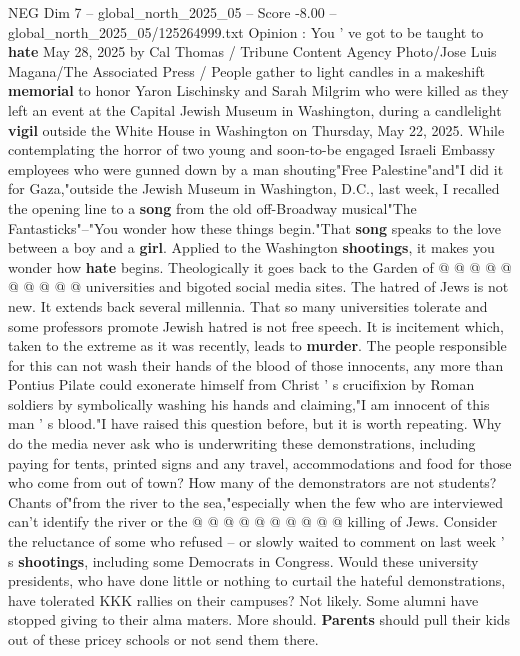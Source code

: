 \begin{textsample}{NEG Dim 7 – global\_north\_2025\_05 – Score -8.00 – global\_north\_2025\_05/125264999.txt}  \label{ex:f7_neg_106}
Opinion : You ' ve got to be taught to \textbf{hate} May 28, 2025 by Cal Thomas / Tribune Content Agency Photo/Jose Luis Magana/The Associated Press / People gather to light candles in a makeshift \textbf{memorial} to honor Yaron Lischinsky and Sarah Milgrim who were killed as they left an event at the Capital Jewish Museum in Washington, during a candlelight \textbf{vigil} outside the White House in Washington on Thursday, May 22, 2025.
While contemplating the horror of two young and soon-to-be engaged Israeli Embassy employees who were gunned down by a man shouting"Free Palestine"and"I did it for Gaza,"outside the Jewish Museum in Washington, D.C., last week, I recalled the opening line to a \textbf{song} from the old off-Broadway musical"The Fantasticks"--"You wonder how these things begin."That \textbf{song} speaks to the love between a boy and a \textbf{girl}.
Applied to the Washington \textbf{shootings}, it makes you wonder how \textbf{hate} begins.
Theologically it goes back to the Garden of @ @ @ @ @ @ @ @ @ @ universities and bigoted social media sites.
The hatred of Jews is not new.
It extends back several millennia.
That so many universities tolerate and some professors promote Jewish hatred is not free speech.
It is incitement which, taken to the extreme as it was recently, leads to \textbf{murder}.
The people responsible for this can not wash their hands of the blood of those innocents, any more than Pontius Pilate could exonerate himself from Christ ' s crucifixion by Roman soldiers by symbolically washing his hands and claiming,"I am innocent of this man ' s blood."I have raised this question before, but it is worth repeating.
Why do the media never ask who is underwriting these demonstrations, including paying for tents, printed signs and any travel, accommodations and food for those who come from out of town?
How many of the demonstrators are not students?
Chants of"from the river to the sea,"especially when the few who are interviewed can't identify the river or the @ @ @ @ @ @ @ @ @ @ killing of Jews.
Consider the reluctance of some who refused -- or slowly waited to comment on last week ' s \textbf{shootings}, including some Democrats in Congress.
Would these university presidents, who have done little or nothing to curtail the hateful demonstrations, have tolerated KKK rallies on their campuses?
Not likely.
Some alumni have stopped giving to their alma maters.
More should. \textbf{Parents} should pull their kids out of these pricey schools or not send them there.

\end{textsample}
